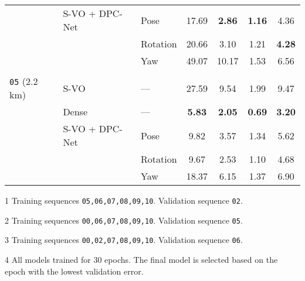 \begin{table}[]
{\begin{threeparttable}
\begin{tabular}{lllcccc}
& S-VO + DPC-Net & Pose     & 17.69                & \textbf{2.86}                 & \textbf{1.16}                    & 4.36                             \\
&                            & Rotation & 20.66                & 3.10                 & 1.21                    & \textbf{4.28}                             \\
&                            & Yaw      & 49.07                & 10.17                & 1.53                    & 6.56                             \\
&                            &          &                      &                      &                         &                                  \\
\texttt{05} (2.2 km)\tnote{3} & S-VO                        &   ---       & 27.59                & 9.54                 & 1.99                    & 9.47                             \\
& Dense                      &   ---       & \textbf{5.83}                 & \textbf{2.05}                 & \textbf{0.69}                    & \textbf{3.20}                             \\
& S-VO + DPC-Net & Pose     & 9.82                 & 3.57                 & 1.34                    & 5.62                             \\
&                            & Rotation & 9.67                 & 2.53                 & 1.10                    & 4.68                             \\
&                            & Yaw      & 18.37                & 6.15                 & 1.37                    & 6.90                      
\\ \bottomrule
\end{tabular}
    \begin{tablenotes}
		\item[1] Training sequences \texttt{05,06,07,08,09,10}. Validation sequence \texttt{02}. \\
		\item[2] Training sequences \texttt{00,06,07,08,09,10}. Validation sequence \texttt{05}. \\
		\item[3] Training sequences \texttt{00,02,07,08,09,10}. Validation sequence \texttt{06}. \\
		\item[4] All models trained for 30 epochs. The final model is selected based on the epoch with the lowest validation error.
    \end{tablenotes}
    \end{threeparttable}
    }
\end{table}

